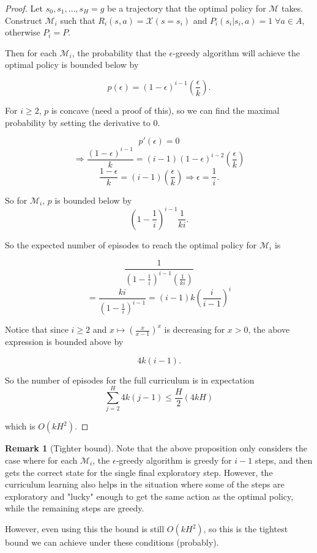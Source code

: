 \documentclass[12pt, letterpaper]{article}
\theoremstyle{definition}
\newtheorem*{rmk}{Remark}
\theoremstyle{remark}
\begin{document}
\begin{proof}[Proof]
    Let \(s_0, s_1, \ldots, s_H = g\) be a trajectory that the optimal policy for \(\mathcal{M}\) takes.
    Construct \(\mathcal{M}_i\) such that \(R_i(s, a) = \mathcal{X}(s = s_i)\) and \(P_i(s_i | s_i, a) = 1 \; \forall a \in A\), otherwise \(P_i = P\).

    Then for each \(\mathcal{M}_i\), the probability that the \(\epsilon\)-greedy algorithm will achieve the optimal policy is bounded below by

    \[p(\epsilon) = (1-\epsilon)^{i-1}(\frac{\epsilon}{k}).\]

    For \(i \geq 2\), \(p\) is concave (need a proof of this), so we can find the maximal probability by setting the derivative to 0.

    \[p'(\epsilon) = 0\]
    \[\Rightarrow \frac{(1-\epsilon)^{i-1}}{k} = (i-1)(1-\epsilon)^{i-2}(\frac{\epsilon}{k})\]
    \[\frac{1-\epsilon}{k} = (i-1)(\frac{\epsilon}{k}) \Rightarrow \epsilon = \frac{1}{i}.\]

    So for \(\mathcal{M}_i\), \(p\) is bounded below by
    \[(1 - \frac{1}{i})^{i-1}\frac{1}{ki}.\]

    So the expected number of episodes to reach the optimal policy for \(\mathcal{M}_i\) is

    \[\frac{1}{(1-\frac{1}{i})^{i-1}(\frac{1}{ki})}\]
    \[= \frac{ki}{(1-\frac{1}{i})^{i-1}} = (i-1)k(\frac{i}{i-1})^i\]

    Notice that since \(i \geq 2\) and \(x \mapsto (\frac{x}{x-1})^x\) is decreasing for \(x > 0\), the above expression is bounded above by

    \[4k(i-1).\]

    So the number of episodes for the full curriculum is in expectation
    \[\sum_{j=2}^{H} 4k(j-1) \leq \frac{H}{2}(4kH)\]

    which is \(O(kH^2)\).
\end{proof}

\begin{rmk}[Tighter bound]
    Note that the above proposition only considers the case where for each \(\mathcal{M}_i\), the \(\epsilon\)-greedy algorithm is greedy for \(i-1\) steps, and then gets the correct state for the single final exploratory step. However, the curriculum learning also helps in the situation where some of the steps are exploratory and "lucky" enough to get the same action as the optimal policy, while the remaining steps are greedy.

    However, even using this the bound is still $O(kH^2)$, so this is the tightest bound we can achieve under these conditions (probably).
\end{rmk}
\end{document}
